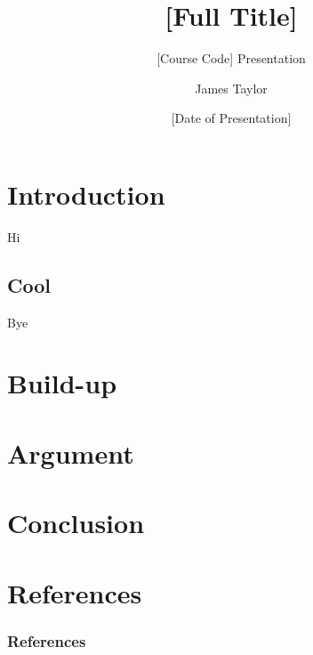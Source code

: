 \documentclass{beamer}
\title[Short Title]{[Full Title]}
\subtitle{[Course Code] Presentation}
\author{James Taylor}
\institute{MathPebbles.com}
\date{[Date of Presentation]}
\begin{document}
\begin{frame}
\titlepage
\end{frame}


\section{Introduction}

\begin{frame}
Hi

\end{frame}

\subsection{Cool}

\begin{frame}
Bye
\end{frame}

\section{Build-up}

\section{Argument}

\section{Conclusion}


\section*{References}
\begin{frame}
    \frametitle{References}
    
    
\end{frame}
\end{document}

